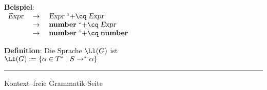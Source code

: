 \begin{slide}{}
\textbf{Beispiel}: \\[0.3cm]
\hspace*{1.3cm} 
$
\begin{array}{lcl}
\textsl{Expr} & \;\rightarrow\; & \textsl{Expr}   \; ``\mathtt{+}\cq \;\textsl{Expr} \\
              & \;\rightarrow\; & \mathbf{number} \; ``\mathtt{+}\cq \;\textsl{Expr} \\
              & \;\rightarrow\; & \mathbf{number} \; ``\mathtt{+}\cq \;\mathbf{number}
\end{array}
$

\textbf{Definition}: Die Sprache $\Ll(G)$ ist \\[0.3cm]
\hspace*{1.3cm} $\Ll(G) := \{ \alpha \in T^* \;|\; S \rightarrow^* \alpha \}$

\vspace*{\fill}
\tiny \addtocounter{mypage}{1}
\rule{17cm}{1mm}
Kontext--freie Grammatik  \hspace*{\fill} Seite 
\end{slide}



